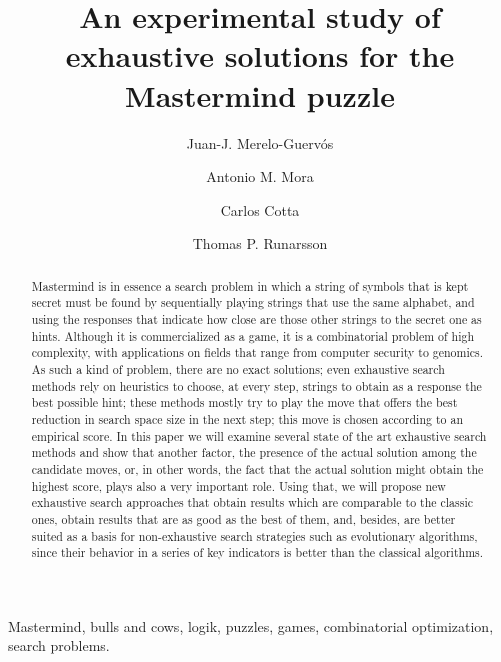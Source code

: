 \documentclass[preprint,12pt]{elsarticle}
\begin{document}
\begin{frontmatter}

\title{An experimental study of exhaustive solutions for the Mastermind puzzle}

\author[ugr,citic]{Juan-J. Merelo-Guerv\'os}
\author[ugr,citic]{Antonio M. Mora}
\author[uma]{Carlos Cotta}
\author[hi]{Thomas P. Runarsson}
\address[ugr]{Dept. of Computer Architecture and Technology,
  University of Granada, Spain, \\ email: \{jmerelo,amorag\}@geneura.ugr.es}
\address[citic]{CITIC, \url{http://citic.ugr.es}}
\address[uma]{ Dept. of Languages and Computer
Sciences, University of M\'alaga, \\ email: ccottap@lcc.uma.es}
\address[hi]{School of Engineering and Natural Sciences, University of Iceland,\\ email: tpr@hi.is }

\begin{abstract}
Mastermind is in essence a search problem in which a string of symbols that is kept secret must be
found by sequentially playing strings that use the same alphabet, and using the responses
that indicate how close are those other strings to the secret one as
hints. Although it is commercialized as a game, it is a combinatorial 
problem of high complexity, with applications on fields that range
from computer security to genomics. As such a kind of problem, there are no
exact solutions; even exhaustive search methods rely on heuristics to
choose, at every step, strings to obtain as a response the best
possible hint; these
methods mostly try to play the move that offers the best reduction in
search space size in the next step; this move is chosen according to
an empirical score. In this paper we will examine several state of the
art  
exhaustive search methods and show that another factor, the presence of the
actual solution among the candidate moves, or, in other words, the
fact that the actual solution might obtain the highest score, plays also a very important
role. Using that, we will propose new exhaustive search approaches 
that obtain results which are comparable to the classic ones, obtain
results that are as good as the best of them, and,
besides, are better suited as a basis for non-exhaustive search
strategies such as evolutionary algorithms, since their behavior in a
series of key indicators is better than the classical algorithms. 

\end{abstract}

\begin{keyword}
Mastermind, bulls and cows, logik, puzzles, games, combinatorial
optimization, search problems.
\end{keyword}

\end{frontmatter}
\end{document}
